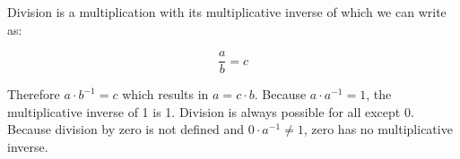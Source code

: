 \documentclass[../main.tex]{subfiles}
\begin{document}
    \begin{table}[htp]
        \begin{center}
            \quad
        \end{center}
    \end{table}

    Division is a multiplication with its multiplicative inverse of which we can write as:

    \begin{equation*}
        \dfrac{a}{b}=c
    \end{equation*}

    \noindent
    Therefore ${a \cdot b^{-1} = c}$ which results in ${a = c \cdot b}$. Because ${a \cdot a ^{-1} = 1}$, the multiplicative inverse of 1 is 1. Division is always possible for all except 0. Because division by zero is not defined and ${0 \cdot a^{-1} \neq 1}$, zero has no multiplicative inverse.
\end{document}
